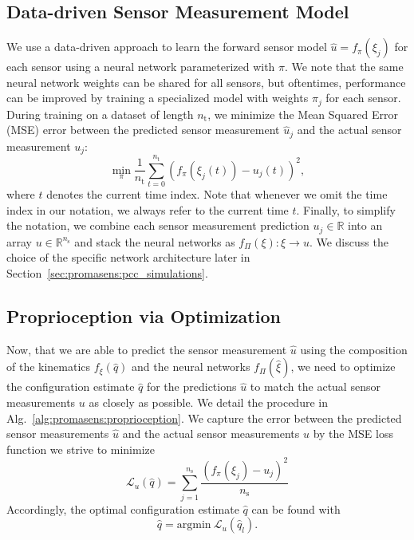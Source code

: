 \subsection{Data-driven Sensor Measurement Model}
\label{sub:promasens:data_driven_approach}
We use a data-driven approach to learn the forward sensor model $\hat{u} = f_{\pi}(\xi_{j})$ for each sensor using a neural network parameterized with $\pi$.
We note that the same neural network weights can be shared for all sensors, but oftentimes, performance can be improved by training a specialized model with weights $\pi_j$ for each sensor.
During training on a dataset of length $n_\mathrm{t}$, we minimize the Mean Squared Error (MSE) error between the predicted sensor measurement $\hat{u}_j$ and the actual sensor measurement $u_j$:
\begin{equation}
    \min_{\pi} \frac{1}{n_\mathrm{t}} \sum_{t = 0}^{n_\mathrm{t}} \left ( f_{\pi}(\xi_{j}(t)) - u_j(t) \right )^2,
\end{equation}
where $t$ denotes the current time index.
Note that whenever we omit the time index in our notation, we always refer to the current time $t$.
Finally, to simplify the notation, we combine each sensor measurement prediction $u_j \in \mathbb{R}$ into an array $u \in \mathbb{R}^{n_\mathrm{s}}$ and stack the neural networks as %
$f_\Pi(\xi): \xi \rightarrow u$. We discuss the choice of the specific network architecture later in Section~\ref{sec:promasens:pcc_simulations}.

\subsection{Proprioception via Optimization}
\label{sub:promasens:proprioception_optimization}

Now, that we are able to predict the sensor measurement $\hat{u}$ using the composition of the kinematics $f_\xi(\hat{q})$ and the neural networks $f_\Pi(\hat{\xi})$, we need to optimize the configuration estimate $\hat{q}$ for the predictions $\hat{u}$ to match the actual sensor measurements $u$ as closely as possible.
We detail the procedure in Alg.~\ref{alg:promasens:proprioception}.
We capture the error between the predicted sensor measurements $\hat{u}$ and the actual sensor measurements $u$ by the MSE loss function we strive to minimize
\begin{equation}\label{eq:promasens:proprioception_loss}
    \mathcal{L}_{u}(\hat{q}) = \sum_{j=1}^{n_\mathrm{s}} \frac{\left ( f_\pi(\xi_j) - u_j \right )^2}{n_\mathrm{s}}
\end{equation}
Accordingly, the optimal configuration estimate $\hat{q}$ can be found with
\begin{equation}
    \hat{q} = \mathrm{argmin} \: \mathcal{L}_{u}(\hat{q}_l).
\end{equation}

